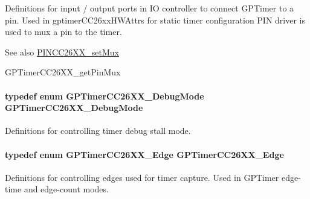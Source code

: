 Definitions for input / output ports in I\+O controller to connect G\+P\+Timer to a pin. Used in gptimer\+C\+C26xx\+H\+W\+Attrs for static timer configuration P\+I\+N driver is used to mux a pin to the timer. 

\begin{DoxySeeAlso}{See also}
\hyperlink{_p_i_n_c_c26_x_x_8h_ac8cbb649db80dd03d8e8a487aef43294}{P\+I\+N\+C\+C26\+X\+X\+\_\+set\+Mux} 

G\+P\+Timer\+C\+C26\+X\+X\+\_\+get\+Pin\+Mux 
\end{DoxySeeAlso}
\paragraph[{G\+P\+Timer\+C\+C26\+X\+X\+\_\+\+Debug\+Mode}]{\setlength{\rightskip}{0pt plus 5cm}typedef enum {\bf G\+P\+Timer\+C\+C26\+X\+X\+\_\+\+Debug\+Mode}  {\bf G\+P\+Timer\+C\+C26\+X\+X\+\_\+\+Debug\+Mode}}\label{_g_p_timer_c_c26_x_x_8h_a1c5a4b610efe0481e6ebf9575820a6f3}


Definitions for controlling timer debug stall mode. 

\paragraph[{G\+P\+Timer\+C\+C26\+X\+X\+\_\+\+Edge}]{\setlength{\rightskip}{0pt plus 5cm}typedef enum {\bf G\+P\+Timer\+C\+C26\+X\+X\+\_\+\+Edge}  {\bf G\+P\+Timer\+C\+C26\+X\+X\+\_\+\+Edge}}\label{_g_p_timer_c_c26_x_x_8h_a32b251408c3c97a16d017a095555aa18}


Definitions for controlling edges used for timer capture. Used in G\+P\+Timer edge-\/time and edge-\/count modes. 

